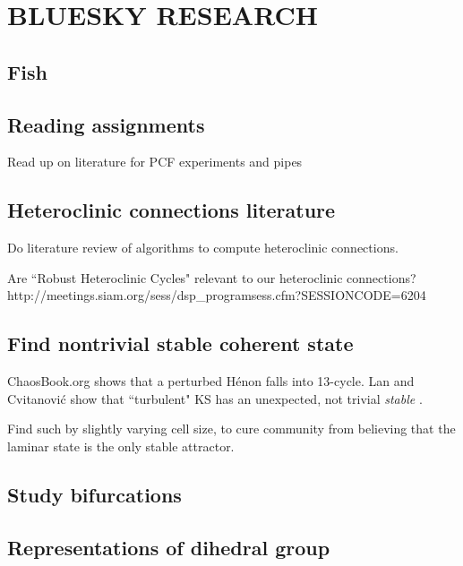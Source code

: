 
\section{BLUESKY RESEARCH}
\label{bluesky}

\subsection{Fish}

\subsection{Reading assignments}

Read up on literature for PCF experiments and pipes

\subsection{Heteroclinic connections literature}

Do literature review of algorithms to
compute heteroclinic connections.

Are ``Robust Heteroclinic Cycles" relevant to our heteroclinic connections?
\\
http://meetings.siam.org/sess/dsp\_programsess.cfm?SESSIONCODE=6204

\subsection{Find nontrivial stable coherent state}

ChaosBook.org shows that a perturbed H\'enon falls into 13-cycle.
Lan and Cvitanovi{\'c} show that ``turbulent" KS has an
unexpected, not trivial {\em stable} \eqv.

Find such by slightly varying cell size,
to cure community from believing that
the laminar state is the only stable attractor.

\subsection{Study bifurcations}

\subsection{Representations of dihedral group}

